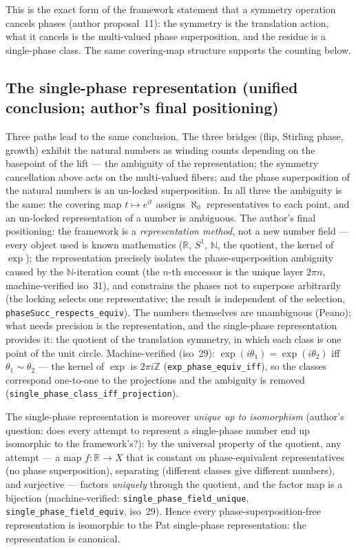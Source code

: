 \documentclass{article}
\begin{document}
This is the exact form of the framework statement that a symmetry
operation cancels phases (author proposal~11): the symmetry is the
translation action, what it cancels is the multi-valued phase
superposition, and the residue is a single-phase class. The same
covering-map structure supports the counting below.

\subsection*{The single-phase representation (unified conclusion; author's final positioning)}

Three paths lead to the same conclusion. The three bridges (flip,
Stirling phase, growth) exhibit the natural numbers as winding counts
depending on the basepoint of the lift --- the ambiguity of the
representation; the symmetry cancellation above acts on the multi-valued
fibers; and the phase superposition of the natural numbers is an
un-locked superposition. In all three the ambiguity is the same: the
covering map $t\mapsto e^{it}$ assigns $\aleph_0$ representatives to
each point, and an un-locked representation of a number is ambiguous.
The author's final positioning: the framework is a \emph{representation
method}, not a new number field --- every object used is known
mathematics ($\mathbb R$, $S^1$, $\mathbb N$, the quotient, the kernel
of $\exp$); the representation precisely isolates the phase-superposition
ambiguity caused by the $\mathbb N$-iteration count (the $n$-th
successor is the unique layer $2\pi n$, machine-verified iso~31), and
constrains the phases not to superpose arbitrarily (the locking selects
one representative; the result is independent of the selection,
\texttt{phaseSucc\_respects\_equiv}). The numbers themselves are
unambiguous (Peano); what needs precision is the representation, and
the single-phase representation provides it: the quotient of the
translation symmetry, in which each class is one point of the unit
circle.
Machine-verified (iso~29):
$\exp(i\theta_1)=\exp(i\theta_2)$ iff $\theta_1\sim\theta_2$ --- the
kernel of $\exp$ is $2\pi i\mathbb Z$
(\texttt{exp\_phase\_equiv\_iff}), so the classes correspond
one-to-one to the projections and the ambiguity is removed
(\texttt{single\_phase\_class\_iff\_projection}).

The single-phase representation is moreover \emph{unique up to
isomorphism} (author's question: does every attempt to represent a
single-phase number end up isomorphic to the framework's?): by the
universal property of the quotient, any attempt --- a map
$f:\mathbb R\to X$ that is constant on phase-equivalent representatives
(no phase superposition), separating (different classes give different
numbers), and surjective --- factors \emph{uniquely} through the
quotient, and the factor map is a bijection
(machine-verified: \texttt{single\_phase\_field\_unique},
\texttt{single\_phase\_field\_equiv}, iso~29). Hence every
phase-superposition-free representation is isomorphic to the Pat
single-phase representation: the representation is canonical.
\end{document}
